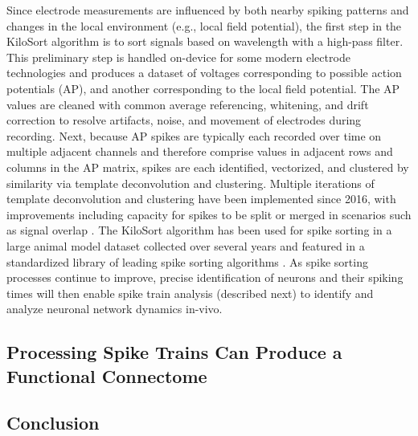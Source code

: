 \documentclass[11pt]{article}
\newcommand{\subsectionwithindent}[1]{
    \subsection*{#1}
    \hspace{\parindent} %
}
\begin{document}
Since electrode measurements are influenced by both nearby spiking patterns and changes in the local environment (e.g., local field potential), the first step in the KiloSort algorithm is to sort signals based on wavelength with a high-pass filter. This preliminary step is handled on-device for some modern electrode technologies \cite{jun2017probes} and produces a dataset of voltages corresponding to possible action potentials (AP), and another corresponding to the local field potential. The AP values are cleaned with common average referencing, whitening, and drift correction to resolve artifacts, noise, and movement of electrodes during recording. Next, because AP spikes are typically each recorded over time on multiple adjacent channels and therefore comprise values in adjacent rows and columns in the AP matrix, spikes are each identified, vectorized, and clustered by similarity via template deconvolution and clustering. Multiple iterations of template deconvolution and clustering have been implemented since 2016, with improvements including capacity for spikes to be split or merged in scenarios such as signal overlap \cite{pachitariu2016kilosort,pachitariu2024kilosort4}. The KiloSort algorithm has been used for spike sorting in a large animal model dataset collected over several years \cite{ibl2022datarelease, ibl2022iblsorter} and featured in a standardized library of leading spike sorting algorithms \cite{buccino2020spikeinterface}. As spike sorting processes continue to improve, precise identification of neurons and their spiking times will then enable spike train analysis (described next) to identify and analyze neuronal network dynamics in-vivo.

\subsectionwithindent{Processing Spike Trains Can Produce a Functional Connectome}


\subsectionwithindent{Conclusion}

\newpage
\printbibliography
\end{document}
